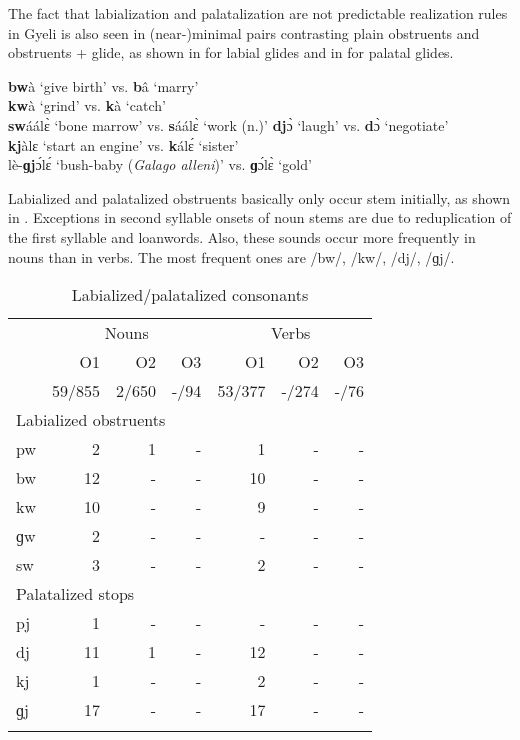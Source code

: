 The fact that labialization and palatalization are not predictable realization rules in Gyeli is also seen in (near-)minimal pairs contrasting plain obstruents and obstruents + glide, as shown in  for labial glides and in  for palatal glides.

\ea \label{obsglidelab}
{\bfseries bw}à `give birth' vs. {\bfseries b}â `marry' \\
{\bfseries kw}à `grind' vs. {\bfseries k}à `catch' \\
{\bfseries sw}áálɛ̀ `bone marrow' vs. {\bfseries s}áálɛ̀ `work (n.)'
\ex \label{obsglidepal}
{\bfseries dj}ɔ̀ `laugh' vs. {\bfseries d}ɔ̀ `negotiate' \\
{\bfseries kj}àlɛ `start an engine' vs. {\bfseries k}álɛ́ `sister' \\
lè-{\bfseries ɡj}ɔ́lɛ́ `bush-baby ({\itshape Galago alleni})' vs. {\bfseries ɡ}ɔ́lɛ̀ `gold'
\z



Labialized and palatalized obstruents basically only occur stem initially, as shown in . Exceptions in second syllable onsets of noun stems are due to reduplication of the first syllable and loanwords. Also, these sounds occur more frequently in nouns than in verbs. The most frequent ones are /bw/, /kw/, /dj/, /ɡj/.

\begin{table}
\begin{tabular}{lrrrrrr}
 \lsptoprule
  &  \multicolumn{3}{c}{Nouns} &  \multicolumn{3}{c}{Verbs} \\\cmidrule(lr){2-4}\cmidrule(lr){5-7}
 & {O1} & {O2} & {O3} &  {O1} & {O2} & {O3}   \\ 
 & 59/855   & 2/650 & -/94 & 53/377 & -/274 &  -/76 \\  \midrule
\multicolumn{7}{l}{Labialized obstruents} \\
                        pw &     2 & 1  &  - & 1 & - & - \\
                        bw  &   12 &  - & - & 10 & - & -    \\
                        kw   & 10  &  -  & - & 9 & - & -   \\
                        ɡw	&   2  & -  & - & - & -  & -    \\ 
                        sw   &   3  & - & - &  2 & -  & -    \\  \midrule
\multicolumn{7}{l}{Palatalized stops}  \\
                           pj & 1  & -  &  - & - & - & -    \\
                           dj &  11  & 1 & - &   12 & - & -   \\
                           kj &     1 & - & - &  2 & - & -  \\
                           ɡj &   17 & -  & - & 17 & - & -  \\
 \lspbottomrule
\end{tabular}
\caption{Labialized/palatalized consonants}
\label{Tab:LabCons}
\end{table}

